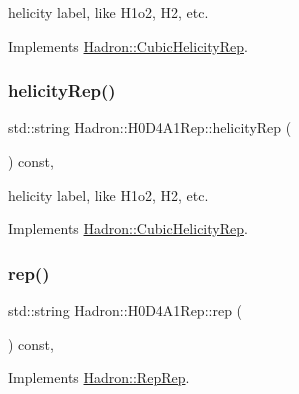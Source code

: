 helicity label, like H1o2, H2, etc. 

Implements \mbox{\hyperlink{structHadron_1_1CubicHelicityRep_af1096946b7470edf0a55451cc662f231}{Hadron\+::\+Cubic\+Helicity\+Rep}}.

\mbox{\label{structHadron_1_1H0D4A1Rep_ae4478095b32b0fd6f52f60f7fd489e6d}} 
\subsubsection{\texorpdfstring{helicityRep()}{helicityRep()}\hspace{0.1cm}{\footnotesize\ttfamily [2/2]}}
{\footnotesize\ttfamily std\+::string Hadron\+::\+H0\+D4\+A1\+Rep\+::helicity\+Rep (\begin{DoxyParamCaption}{ }\end{DoxyParamCaption}) const\hspace{0.3cm}{\ttfamily [inline]}, {\ttfamily [virtual]}}

helicity label, like H1o2, H2, etc. 

Implements \mbox{\hyperlink{structHadron_1_1CubicHelicityRep_af1096946b7470edf0a55451cc662f231}{Hadron\+::\+Cubic\+Helicity\+Rep}}.

\mbox{\label{structHadron_1_1H0D4A1Rep_afbedc9857e7215106a2225ff351ada68}} 
\subsubsection{\texorpdfstring{rep()}{rep()}\hspace{0.1cm}{\footnotesize\ttfamily [1/3]}}
{\footnotesize\ttfamily std\+::string Hadron\+::\+H0\+D4\+A1\+Rep\+::rep (\begin{DoxyParamCaption}{ }\end{DoxyParamCaption}) const\hspace{0.3cm}{\ttfamily [inline]}, {\ttfamily [virtual]}}



Implements \mbox{\hyperlink{structHadron_1_1RepRep_ab3213025f6de249f7095892109575fde}{Hadron\+::\+Rep\+Rep}}.

\mbox{\label{structHadron_1_1H0D4A1Rep_afbedc9857e7215106a2225ff351ada68}} 
